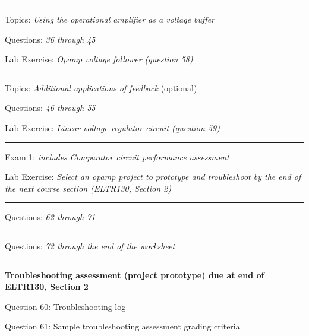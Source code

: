 
\vskip 10pt
\hrule \vskip 5pt
\noindent
{}

\hskip 10pt Topics: {\it Using the operational amplifier as a voltage buffer}
 
\hskip 10pt Questions: {\it 36 through 45}
 
\hskip 10pt Lab Exercise: {\it Opamp voltage follower (question 58)}
 

\vskip 10pt
\hrule \vskip 5pt
\noindent
{}

\hskip 10pt Topics: {\it Additional applications of feedback} (optional)
 
\hskip 10pt Questions: {\it 46 through 55}
 
\hskip 10pt Lab Exercise: {\it Linear voltage regulator circuit (question 59)}
 

\vskip 10pt
\hrule \vskip 5pt
\noindent
{}

\hskip 10pt Exam 1: {\it includes Comparator circuit performance assessment}
 
\hskip 10pt Lab Exercise: {\it Select an opamp project to prototype and troubleshoot by the end of the next course section (ELTR130, Section 2)}
  
\vskip 10pt
\hrule \vskip 5pt
\noindent
{}

\hskip 10pt Questions: {\it 62 through 71}
 
\vskip 10pt
\hrule \vskip 5pt
\noindent
{}

\hskip 10pt Questions: {\it 72 through the end of the worksheet}
 
\vskip 10pt
\hrule \vskip 5pt
\noindent
{}

\hskip 10pt {\bf Troubleshooting assessment (project prototype) due at end of ELTR130, Section 2}

\hskip 10pt Question 60: Troubleshooting log
 
\hskip 10pt Question 61: Sample troubleshooting assessment grading criteria
 
